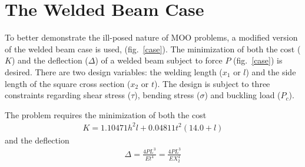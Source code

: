 \FloatBarrier
\section{The Welded Beam Case}

To better demonstrate the ill-posed nature of MOO problems, a modified version of the welded beam case \cite{coello2000use} is used, (fig.\ \ref{case}).  The minimization of both the cost ($K$) and the deflection ($\Delta$) of a welded beam subject to force $P$ (fig.\ \ref{case}) is desired. There are two design variables: the welding length ($x_1$ or $l$)  and the side length of the square cross section ($x_2$ or $t$). The design is subject to three constraints regarding shear stress ($\tau$), bending stress ($\sigma$) and buckling load ($P_c$).    



The problem requires the minimization of both the cost
\begin{eqnarray}\nonumber
   K = 1.10471h^2l+0.04811t^2(14.0+l) %
   \label{Cost} 
\end{eqnarray}
and the deflection
\begin{eqnarray}
   \Delta = \frac{4PL^3}{Et^4} = \frac{4PL^3}{EX_2^4}
   \label{Deflection} 
\end{eqnarray}

